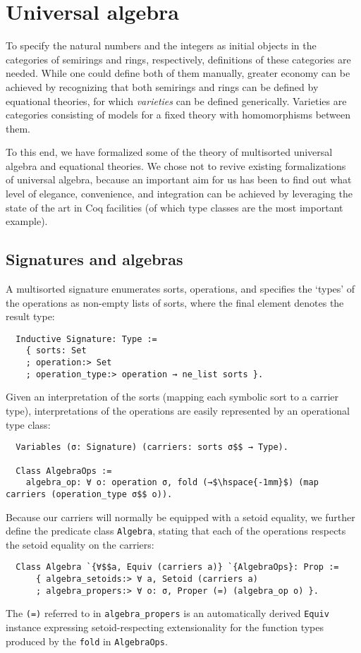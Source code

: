 \documentclass[a4paper,10pt,runningheads]{llncs}
\begin{document}
\section{Universal algebra}\label{univ}

To specify the natural numbers and the integers as initial objects in the categories of semirings and rings, respectively, definitions of these categories are needed. While one could define both of them manually, greater economy can be achieved by recognizing that both semirings and rings can be defined by equational theories, for which \emph{varieties} can be defined generically. Varieties are categories consisting of models for a fixed theory with homomorphisms between them.

To this end, we have formalized some of the theory of multisorted universal algebra and equational theories. We chose not to revive existing formalizations~\cite{DBLP:conf/tphol/Capretta99,dominguez2008formalizing} of universal algebra, because an important aim for us has been to find out what level of elegance, convenience, and integration can be achieved by leveraging the state of the art in Coq facilities (of which type classes are the most important example).

\subsection{Signatures and algebras}

A multisorted signature enumerates sorts, operations, and specifies the `types' of the operations as non-empty lists of sorts, where the final element denotes the result type:
\begin{lstlisting}
  Inductive Signature: Type :=
    { sorts: Set
    ; operation:> Set
    ; operation_type:> operation → ne_list sorts }.
\end{lstlisting}
Given an interpretation of the sorts (mapping each symbolic sort to a carrier type), interpretations of the operations are easily represented by an operational type class:
\begin{lstlisting}
  Variables (σ: Signature) (carriers: sorts σ$$ → Type).

  Class AlgebraOps :=
    algebra_op: ∀ o: operation σ, fold (→$\hspace{-1mm}$) (map carriers (operation_type σ$$ o)).
\end{lstlisting}
Because our carriers will normally be equipped with a setoid equality, we further define the predicate class \lstinline|Algebra|, stating that each of the operations respects the setoid equality on the carriers:
\begin{lstlisting}
  Class Algebra `{∀$$a, Equiv (carriers a)} `{AlgebraOps}: Prop :=
      { algebra_setoids:> ∀ a, Setoid (carriers a)
      ; algebra_propers:> ∀ o: σ, Proper (=) (algebra_op o) }.
\end{lstlisting}
The \lstinline|(=)| referred to in \lstinline|algebra_propers| is an automatically derived \lstinline|Equiv| instance expressing setoid-respecting extensionality for the function types produced by the \lstinline|fold| in \lstinline|AlgebraOps|.
\end{document}
